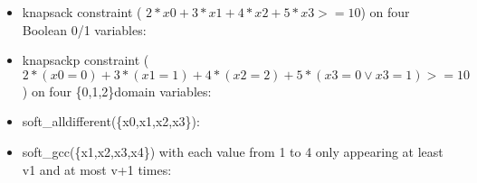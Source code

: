 \documentclass[letterpaper,10pt,openany,oneside,english]{sphinxmanual}
\begin{document}
\begin{fulllineitems}
\begin{itemize}
\item {} 
\sphinxAtStartPar
knapsack constraint ( \(2 * x0 + 3 * x1 + 4 * x2 + 5 * x3 >= 10\)) on four Boolean 0/1 variables:
\begin{sphinxVerbatim}[commandchars=\\\{\}]
            
\end{sphinxVerbatim}


\item {} 
\sphinxAtStartPar
knapsackp constraint ( \(2 * (x0=0) + 3 * (x1=1) + 4 * (x2=2) + 5 * (x3=0 \vee x3=1) >= 10\)) on four \{0,1,2\}\sphinxhyphen{}domain variables:
\begin{sphinxVerbatim}[commandchars=\\\{\}]
                     
\end{sphinxVerbatim}


\item {} 
\sphinxAtStartPar
soft\_alldifferent(\{x0,x1,x2,x3\}):
\begin{sphinxVerbatim}[commandchars=\\\{\}]
         
\end{sphinxVerbatim}


\item {} 
\sphinxAtStartPar
soft\_gcc(\{x1,x2,x3,x4\}) with each value  from 1 to 4 only appearing at least v\sphinxhyphen{}1 and at most v+1 times:
\begin{sphinxVerbatim}[commandchars=\\\{\}]
                      
\end{sphinxVerbatim}



\end{itemize}
\end{fulllineitems}
\end{document}
